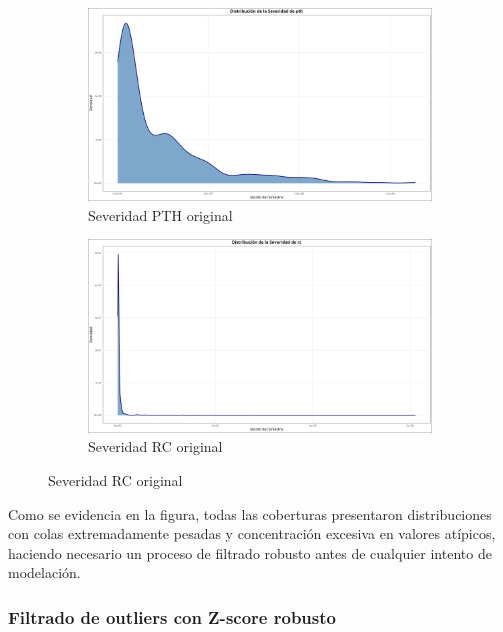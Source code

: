 \begin{figure}[H]
\begin{subfigure}{0.35\textwidth}
    \end{subfigure}
    \\[0.5em]
    \begin{subfigure}{0.35\textwidth}
        \includegraphics[width=\textwidth]{../images/distribucion_severidad_pth.png}
        \caption{Severidad PTH original}
    \end{subfigure}
    \hfill
    \begin{subfigure}{0.35\textwidth}
        \includegraphics[width=\textwidth]{../images/distribucion_severidad_rc.png}
        \caption{Severidad RC original}
    \end{subfigure}
\end{figure}

Como se evidencia en la figura, todas las coberturas presentaron distribuciones con colas extremadamente pesadas y concentración excesiva en valores atípicos, haciendo necesario un proceso de filtrado robusto antes de cualquier intento de modelación.

\subsubsection{Filtrado de outliers con Z-score robusto}

